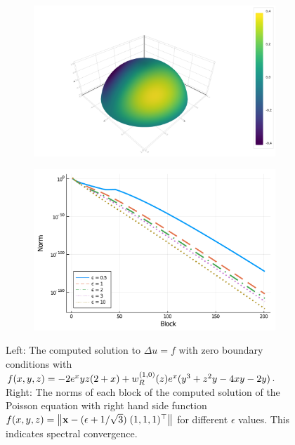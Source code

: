 \documentclass[11pt, oneside]{article}   	%
\begin{document}
\begin{figure}[t]
	\begin{subfigure}{0.5\textwidth}
	\includegraphics[scale=0.25]{poisson-u=wyexpx-N=60}
	\centering
	\end{subfigure}
	\begin{subfigure}{0.5\textwidth}
	\centering
	\includegraphics[scale=0.3]{solutionblocknorms-poisson-epsilonfun-N=200}
	\end{subfigure}
	\caption{Left: The computed solution to $\Delta u = f$ with zero boundary conditions with $f(x,y,z) = - 2 e^x y z (2+x) + w_R^{(1,0)}(z) e^x (y^3 + z^2 y - 4xy - 2y)$. Right: The norms of each block of the computed solution of the Poisson equation with right hand side function $f(x,y,z) = \left\| \mathbf{x} - (\epsilon + 1 / \sqrt{3}) \; (1,1,1)^\top  \right\|$ for different $\epsilon$ values. This indicates spectral convergence.}
	\centering
	\label{fig:poisson}
\end{figure}
\end{document}
